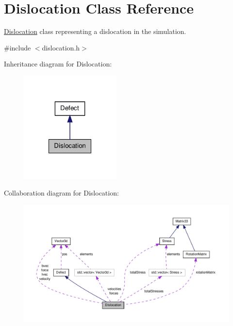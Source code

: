 \hypertarget{classDislocation}{\section{\-Dislocation \-Class \-Reference}
\label{d3/dc6/classDislocation}
}


\hyperlink{classDislocation}{\-Dislocation} class representing a dislocation in the simulation.  




{\ttfamily \#include $<$dislocation.\-h$>$}



\-Inheritance diagram for \-Dislocation\-:
\nopagebreak
\begin{figure}[H]
\begin{center}
\leavevmode
\includegraphics[width=144pt]{df/dfa/classDislocation__inherit__graph}
\end{center}
\end{figure}


\-Collaboration diagram for \-Dislocation\-:
\nopagebreak
\begin{figure}[H]
\begin{center}
\leavevmode
\includegraphics[width=350pt]{d7/d80/classDislocation__coll__graph}
\end{center}
\end{figure}
